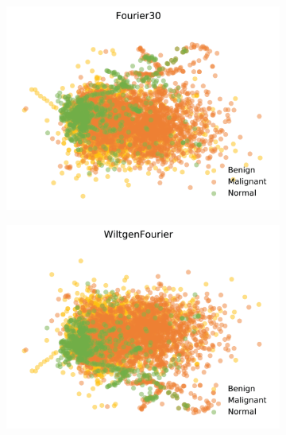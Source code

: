 \begin{figure}[H]
    \begin{subfigure}{.45\textwidth}
      \includegraphics[width=\textwidth]{contents/chapter_4/resources/visualisation_frequency_Fourier30.png}
    \end{subfigure}
    \begin{subfigure}{.45\textwidth}
      \includegraphics[width=\textwidth]{contents/chapter_4/resources/visualisation_frequency_wiltgenfourier.png}
    \end{subfigure}
    

\end{figure}
